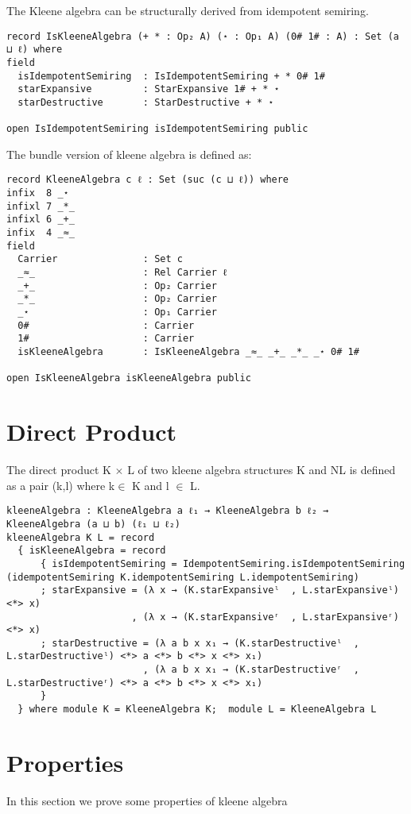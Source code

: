 The Kleene algebra can be structurally derived from idempotent semiring. 
\begin{verbatim}
record IsKleeneAlgebra (+ * : Op₂ A) (⋆ : Op₁ A) (0# 1# : A) : Set (a ⊔ ℓ) where
field
  isIdempotentSemiring  : IsIdempotentSemiring + * 0# 1#
  starExpansive         : StarExpansive 1# + * ⋆
  starDestructive       : StarDestructive + * ⋆

open IsIdempotentSemiring isIdempotentSemiring public
\end{verbatim}
The bundle version of kleene algebra is defined as: 
\begin{verbatim}
record KleeneAlgebra c ℓ : Set (suc (c ⊔ ℓ)) where
infix  8 _⋆
infixl 7 _*_
infixl 6 _+_
infix  4 _≈_
field
  Carrier               : Set c
  _≈_                   : Rel Carrier ℓ
  _+_                   : Op₂ Carrier
  _*_                   : Op₂ Carrier
  _⋆                    : Op₁ Carrier
  0#                    : Carrier
  1#                    : Carrier
  isKleeneAlgebra       : IsKleeneAlgebra _≈_ _+_ _*_ _⋆ 0# 1#

open IsKleeneAlgebra isKleeneAlgebra public
\end{verbatim}
\section{Direct Product}
The direct product K \(\times\) L of two kleene algebra structures K and NL is
defined as a pair (k,l) where k\(\in\) K and l \(\in\) L.
\begin{verbatim}
kleeneAlgebra : KleeneAlgebra a ℓ₁ → KleeneAlgebra b ℓ₂ → KleeneAlgebra (a ⊔ b) (ℓ₁ ⊔ ℓ₂)
kleeneAlgebra K L = record
  { isKleeneAlgebra = record
      { isIdempotentSemiring = IdempotentSemiring.isIdempotentSemiring (idempotentSemiring K.idempotentSemiring L.idempotentSemiring)
      ; starExpansive = (λ x → (K.starExpansiveˡ  , L.starExpansiveˡ) <*> x)
                      , (λ x → (K.starExpansiveʳ  , L.starExpansiveʳ) <*> x)
      ; starDestructive = (λ a b x x₁ → (K.starDestructiveˡ  , L.starDestructiveˡ) <*> a <*> b <*> x <*> x₁)
                        , (λ a b x x₁ → (K.starDestructiveʳ  , L.starDestructiveʳ) <*> a <*> b <*> x <*> x₁)
      }
  } where module K = KleeneAlgebra K;  module L = KleeneAlgebra L
\end{verbatim}

\section{Properties}
In this section we prove some properties of kleene algebra

